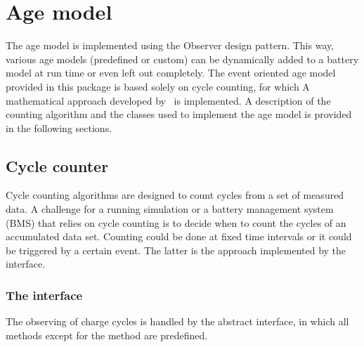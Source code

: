 \section{Age model}
The age model is implemented using the Observer design pattern. This way, various age models (predefined or custom) can be dynamically added to a battery model at run time or even left out completely. The event oriented age model provided in this package is based solely on cycle counting, for which A mathematical approach developed by~\cite{dambrowski_mathematical_2012} is implemented. A description of the counting algorithm and the classes used to implement the age model is provided in the following sections.
\subsection{Cycle counter}
Cycle counting algorithms are designed to count cycles from a set of measured data. A challenge for a running simulation or a battery management system (BMS) that relies on cycle counting is to decide when to count the cycles of an accumulated data set. Counting could be done at fixed time intervals or it could be triggered by a certain event. The latter is the approach implemented by the  interface.
\subsubsection{The  interface}
The observing of charge cycles is handled by the abstract  interface, in which all methods except for the  method are predefined.